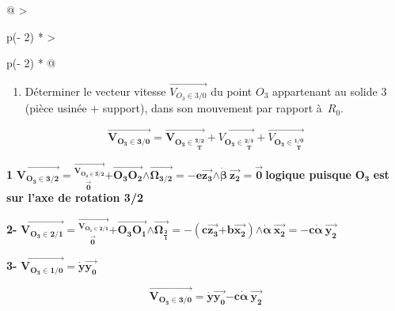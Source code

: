 \begin{longtable}{@{}
  >{\raggedright\arraybackslash}p{(\columnwidth - 2\tabcolsep) * }
  >{\raggedright\arraybackslash}p{(\columnwidth - 2\tabcolsep) * }@{}}
\begin{minipage}[b]{\linewidth}
\begin{enumerate}
\def\labelenumi{\arabic{enumi}.}
\setcounter{enumi}{1}
\item
  Déterminer le vecteur vitesse \(\overrightarrow{V_{O_{3} \in 3/0}}\)
  du point \(O_{3}\) appartenant au solide 3 (pièce usinée + support),
  dans son mouvement par rapport à~\(R_{0}\).
\end{enumerate}

\[\overrightarrow{\mathbf{V}_{\mathbf{O}_{\mathbf{3}}\mathbf{\in}\mathbf{3}\mathbf{/0}}}\mathbf{=}\overrightarrow{\mathbf{V}_{\mathbf{O}_{\mathbf{3}}\mathbf{\in}\underset{\mathbf{T}}{\overset{\mathbf{3}\mathbf{/}\mathbf{2}}{}}}} + \overrightarrow{V_{\mathbf{O}_{\mathbf{3}}\mathbf{\in}\underset{\mathbf{T}}{\overset{\mathbf{2}\mathbf{/}\mathbf{1}}{}}}} + \overrightarrow{V_{\mathbf{O}_{\mathbf{3}}\mathbf{\in}\underset{\mathbf{T}}{\overset{\mathbf{1}\mathbf{/}\mathbf{0}}{}}}}\]

\textbf{1}
\(\overrightarrow{\mathbf{V}_{\mathbf{O}_{\mathbf{3}}\mathbf{\in}\mathbf{3/2}}}\mathbf{=}\overrightarrow{\underset{\overrightarrow{\mathbf{0}}\mathbf{\ }}{\overset{\mathbf{V}_{\mathbf{O}_{\mathbf{2}}\mathbf{\in}\mathbf{3/2}}}{}}}\mathbf{+}\overrightarrow{\mathbf{O}_{\mathbf{3}}\mathbf{O}_{\mathbf{2}}}\mathbf{\land}\overrightarrow{\mathbf{\Omega}_{\mathbf{3/2}}}\mathbf{= - e}\overrightarrow{\mathbf{z}_{\mathbf{3}}}\mathbf{\land}\dot{\mathbf{\beta}}\mathbf{\ }\overrightarrow{\mathbf{z}_{\mathbf{2}}}\mathbf{=}\overrightarrow{\mathbf{0}}\mathbf{\ }\)\textbf{logique
puisque} \(\mathbf{O}_{\mathbf{3}}\) \textbf{est sur l'axe de rotation
3/2}

\textbf{2-}
\(\overrightarrow{\mathbf{V}_{\mathbf{O}_{\mathbf{3}}\mathbf{\in}\mathbf{2/1}}}\mathbf{=}\overrightarrow{\underset{\overrightarrow{\mathbf{0}}\mathbf{\ }}{\overset{\mathbf{V}_{\mathbf{O}_{\mathbf{1}}\mathbf{\in}\mathbf{2/1}}}{}}}\mathbf{+}\overrightarrow{\mathbf{O}_{\mathbf{3}}\mathbf{O}_{\mathbf{1}}}\mathbf{\land}\overrightarrow{\mathbf{\Omega}_{\frac{\mathbf{2}}{\mathbf{1}}}}\mathbf{= -}\left( \mathbf{c}\overrightarrow{\mathbf{z}_{\mathbf{3}}}\mathbf{+}\mathbf{b}\overrightarrow{\mathbf{x}_{\mathbf{2}}} \right)\mathbf{\land}\dot{\mathbf{\alpha}}\mathbf{\ }\overrightarrow{\mathbf{x}_{\mathbf{2}}}\mathbf{= - c}\dot{\mathbf{\alpha}}\mathbf{\ }\overrightarrow{\mathbf{y}_{\mathbf{2}}}\)

\textbf{3-}
\(\overrightarrow{\mathbf{V}_{\mathbf{O}_{\mathbf{3}}\mathbf{\in}\mathbf{1/0}}}\mathbf{=}\dot{\mathbf{y}}\overrightarrow{\mathbf{y}_{\mathbf{0}}}\)

\[\overrightarrow{\mathbf{V}_{\mathbf{O}_{\mathbf{3}}\mathbf{\in}\mathbf{3}\mathbf{/0}}}\mathbf{=}\dot{\mathbf{y}}\overrightarrow{\mathbf{y}_{\mathbf{0}}}\mathbf{- c}\dot{\mathbf{\alpha}}\mathbf{\ }\overrightarrow{\mathbf{y}_{\mathbf{2}}}\]
\end{minipage} \\
\midrule\noalign{}
\endhead
\bottomrule\noalign{}
\endlastfoot
\end{longtable}

